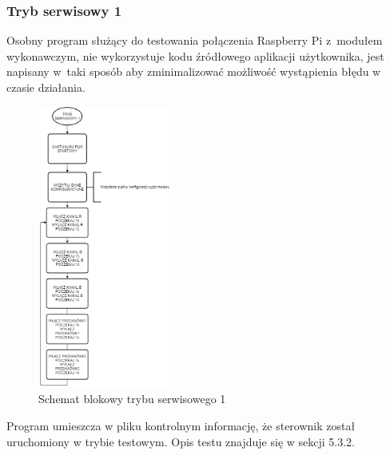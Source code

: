 \documentclass[12pt, eng, twoside, openany, final]{mgr}
\begin{document}
                    \subsubsection{Tryb serwisowy 1}
                    Osobny program służący do testowania połączenia Raspberry Pi z~modułem wykonawczym, nie wykorzystuje kodu źródłowego aplikacji użytkownika, jest napisany w~taki sposób aby zminimalizować możliwość wystąpienia błędu w czasie działania.
                        \begin{figure}[H]
                        \begin{center}
                            \includegraphics[width=0.4\textwidth]{t1.png}
                            \caption{Schemat blokowy trybu serwisowego 1} \label{fig:serT1}
                        \end{center}
                        \end{figure}
                        \noindent Program umieszcza w pliku kontrolnym informację, że sterownik został uruchomiony w trybie testowym. Opis testu znajduje się w sekcji 5.3.2. 

                        \newpage
                    
\end{document}
